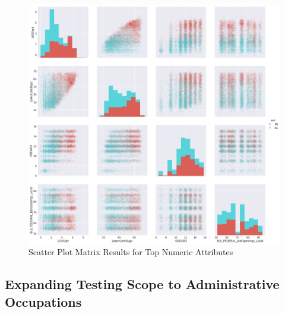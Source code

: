 \documentclass{article}
\begin{document}
\subparagraph{}
\begin{figure}[H]
\centering
\includegraphics[width=\linewidth]{ScatterMatrix.jpg}
\caption{Scatter Plot Matrix Results for Top Numeric Attributes}
\label{fig:ScatterMatrix}
\end{figure}


\subsection{Expanding Testing Scope to Administrative Occupations}
\end{document}
